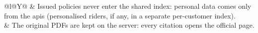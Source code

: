 \noindent
\begin{tabularx}{\textwidth}{@{}l@{\hspace{8pt}}Y@{}}
  {\color{accent}\faUserSecret} & Issued policies never enter the shared index: personal data
    comes only from the \acsp{api} (personalised riders, if any, in a separate per-customer
    index). \\[2pt]
  {\color{accent}\faFilePdf} & The original PDFs are kept on the server: every citation opens
    the official page. \\
\end{tabularx}
